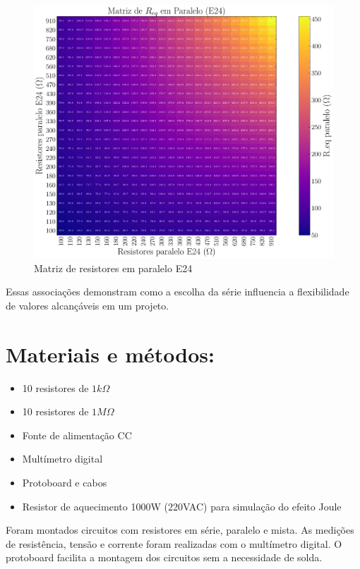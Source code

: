 \documentclass[conference]{IEEEtran}
\begin{document}
\begin{figure}[htbp]
    \centering
    \caption{Matriz de resistores em paralelo E24}
    \label{fig:matriz_paralelo_e24}
    \includegraphics[width=0.8\linewidth]{figures/matriz_paralelo_e24.pdf}
\end{figure}


Essas associações demonstram como a escolha da série influencia a flexibilidade de valores alcançáveis em um projeto.



\section{Materiais e métodos:}

\begin{itemize}
    \item 10 resistores de $1k\Omega$ %
    \item 10 resistores de $1M\Omega$
    \item Fonte de alimentação CC
    \item Multímetro digital
    \item Protoboard e cabos
    \item Resistor de aquecimento 1000W (220VAC) para simulação do efeito Joule
\end{itemize}

Foram montados circuitos com resistores em série, paralelo e mista. As medições de resistência, tensão e corrente foram realizadas com o multímetro digital. O protoboard facilita a montagem dos circuitos sem a necessidade de solda.
\end{document}
